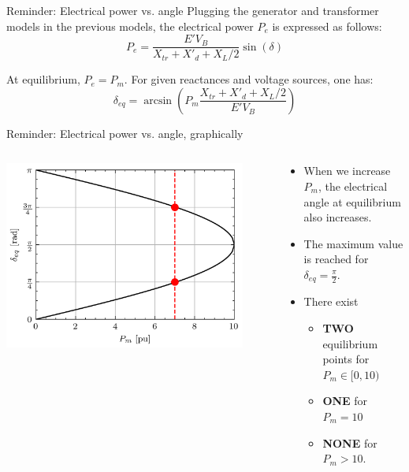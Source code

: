 \begin{frame}{Reminder: Electrical power vs. angle}
Plugging the generator and transformer models in the previous models, 
the electrical power $P_e$ is expressed as follows:
\begin{equation}
P_e = \frac{E' V_B}{X_{tr}+X'_d + X_L/2} \sin(\delta)    \label{eq:P_e_delta}
\end{equation}

At equilibrium, $P_e = P_m$. For given reactances and voltage sources, one has:
$$\delta_{eq} = \arcsin\left(P_m \frac{X_{tr}+X'_d + X_L/2}{E' V_B}\right)$$
\end{frame}

\begin{frame}{Reminder: Electrical power vs. angle, graphically}
    \begin{columns}
    \begin{column}{0.55\textwidth}
    \begin{center}
    \includegraphics[width=0.9\textwidth]{images/delta_P_m.png}
    \end{center}
    \end{column}
    \begin{column}{0.45\textwidth}

    \begin{itemize}
        \item When we increase $P_{m}$, the electrical angle at equilibrium also increases. 
        \item The maximum value is reached for $\delta_{eq} = \frac{\pi}{2}$.
        \item There exist 
            \begin{itemize}
                \item \textbf{TWO} equilibrium points for $P_m \in [0,10)$
                \item  \textbf{ONE} for $P_m = 10$
                \item  \textbf{NONE} for $P_m>10$.
            \end{itemize}
    \end{itemize}
    \end{column}
\end{columns}


\end{frame}

